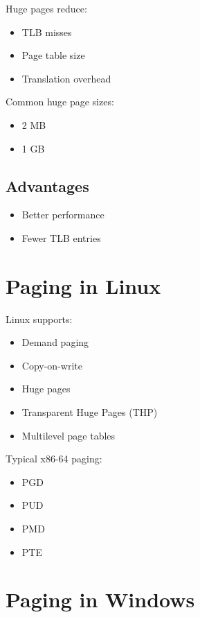 Huge pages reduce:

\begin{itemize}
\item TLB misses
\item Page table size
\item Translation overhead
\end{itemize}

Common huge page sizes:

\begin{itemize}
\item 2 MB
\item 1 GB
\end{itemize}

\subsection{Advantages}

\begin{itemize}
\item Better performance
\item Fewer TLB entries
\end{itemize}

\section{Paging in Linux}

Linux supports:

\begin{itemize}
\item Demand paging
\item Copy-on-write
\item Huge pages
\item Transparent Huge Pages (THP)
\item Multilevel page tables
\end{itemize}

Typical x86-64 paging:

\begin{itemize}
\item PGD
\item PUD
\item PMD
\item PTE
\end{itemize}

\section{Paging in Windows}

